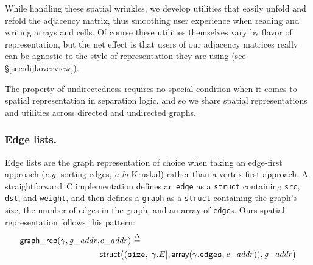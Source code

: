 While handling these spatial wrinkles, we develop utilities that easily 
unfold and refold the adjacency matrix, thus smoothing user 
experience when reading and writing arrays and cells. Of course
these utilities themselves vary by flavor of representation, but 
the net effect is that users of our adjacency matrices really can 
be agnostic to the style of representation they are using 
(see \S\ref{sec:dijkoverview}).

The property of undirectedness requires no special condition 
when it comes to spatial representation in separation logic, 
and so we share spatial representations and utilities 
across directed and undirected graphs.


\subsubsection{Edge lists.}

Edge lists are the graph representation of choice when 
taking an edge-first approach
(\emph{e.g.} sorting edges, \emph{a la} Kruskal) 
rather than a vertex-first approach.
A straightforward~C implementation 
defines an \texttt{edge} as a 
\texttt{struct} containing \texttt{src}, \texttt{dst}, and 
\texttt{weight}, and then defines a \texttt{graph} as a 
\texttt{struct} containing 
the graph's size, the number of edges in the graph, 
and an array of \texttt{edge}s. Ours spatial representation 
follows this pattern:
\vspace{-0.5em}
\begin{equation*}
\begin{split}
\mathsf{graph\_rep}(\gamma, \mathit{g\_addr}, &\mathit{e\_addr})~\mathbin{\stackrel{\Delta}{=}} \\
&\mathsf{struct}\big((\texttt{size}, \lvert\gamma.E\rvert,\mathsf{array}(\gamma.\texttt{edges},\mathit{e\_addr})),\mathit{g\_addr}\big)
\end{split}
\end{equation*}

